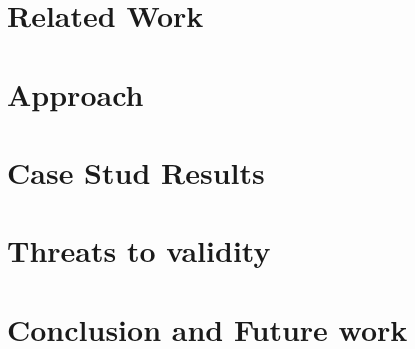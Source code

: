 \documentclass[conference]{IEEEtran}
\begin{document}
\section{Related Work}
\label{sec:related_work}


\section{Approach}
\label{sec:approach}


\section{Case Stud Results}
\label{sec:results}


\section{Threats to validity}
\label{sec:threats_to_validity}


\section{Conclusion and Future work}
\label{sec:conclusion}




\end{document}
